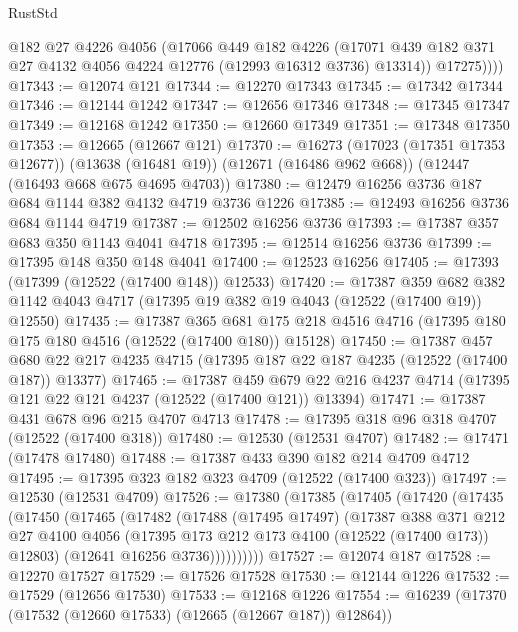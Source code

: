 \begin{lexlean}{RustStd}
\begin{coremodule}
            @182
            @27
            @4226
            @4056
            (@17066
              @449
              @182
              @4226
              (@17071 @439 @182 @371 @27 @4132 @4056 @4224 @12776 (@12993 @16312 @3736) @13314))
            @17275))))
@17343 := @12074 @121
@17344 := @12270 @17343
@17345 := @17342 @17344
@17346 := @12144 @1242
@17347 := @12656 @17346
@17348 := @17345 @17347
@17349 := @12168 @1242
@17350 := @12660 @17349
@17351 := @17348 @17350
@17353 := @12665 (@12667 @121)
@17370 := @16273
    (@17023 (@17351 @17353 @12677))
    (@13638 (@16481 @19))
    (@12671 (@16486 @962 @668))
    (@12447 (@16493 @668 @675 @4695 @4703))
@17380 := @12479 @16256 @3736 @187 @684 @1144 @382 @4132 @4719 @3736 @1226
@17385 := @12493 @16256 @3736 @684 @1144 @4719
@17387 := @12502 @16256 @3736
@17393 := @17387 @357 @683 @350 @1143 @4041 @4718
@17395 := @12514 @16256 @3736
@17399 := @17395 @148 @350 @148 @4041
@17400 := @12523 @16256
@17405 := @17393 (@17399 (@12522 (@17400 @148)) @12533)
@17420 := @17387
    @359
    @682
    @382
    @1142
    @4043
    @4717
    (@17395 @19 @382 @19 @4043 (@12522 (@17400 @19)) @12550)
@17435 := @17387
    @365
    @681
    @175
    @218
    @4516
    @4716
    (@17395 @180 @175 @180 @4516 (@12522 (@17400 @180)) @15128)
@17450 := @17387
    @457
    @680
    @22
    @217
    @4235
    @4715
    (@17395 @187 @22 @187 @4235 (@12522 (@17400 @187)) @13377)
@17465 := @17387
    @459
    @679
    @22
    @216
    @4237
    @4714
    (@17395 @121 @22 @121 @4237 (@12522 (@17400 @121)) @13394)
@17471 := @17387 @431 @678 @96 @215 @4707 @4713
@17478 := @17395 @318 @96 @318 @4707 (@12522 (@17400 @318))
@17480 := @12530 (@12531 @4707)
@17482 := @17471 (@17478 @17480)
@17488 := @17387 @433 @390 @182 @214 @4709 @4712
@17495 := @17395 @323 @182 @323 @4709 (@12522 (@17400 @323))
@17497 := @12530 (@12531 @4709)
@17526 := @17380
    (@17385
      (@17405
        (@17420
          (@17435
            (@17450
              (@17465
                (@17482
                  (@17488
                    (@17495 @17497)
                    (@17387
                      @388
                      @371
                      @212
                      @27
                      @4100
                      @4056
                      (@17395 @173 @212 @173 @4100 (@12522 (@17400 @173)) @12803)
                      (@12641 @16256 @3736))))))))))
@17527 := @12074 @187
@17528 := @12270 @17527
@17529 := @17526 @17528
@17530 := @12144 @1226
@17532 := @17529 (@12656 @17530)
@17533 := @12168 @1226
@17554 := @16239
    (@17370 (@17532 (@12660 @17533) (@12665 (@12667 @187)) @12864))

\end{coremodule}
\end{lexlean}
